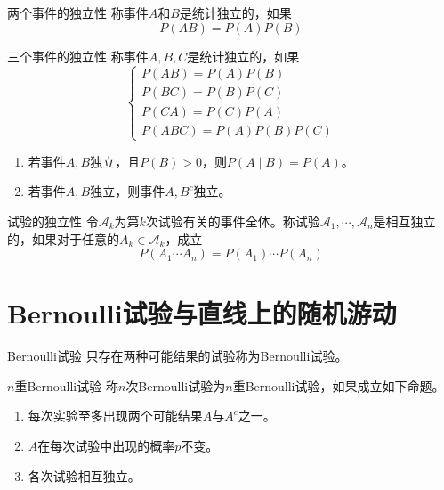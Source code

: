 \documentclass[lang = cn, scheme = chinese, thmcnt = section]{elegantbook}
\begin{document}
\begin{definition}{两个事件的独立性}
	称事件$A$和$B$是统计独立的，如果
	$$
	P(AB)=P(A)P(B)
	$$
\end{definition}

\begin{definition}{三个事件的独立性}
	称事件$A,B,C$是统计独立的，如果
	$$
	\begin{cases}
		P(AB)=P(A)P(B)\\
		P(BC)=P(B)P(C)\\
		P(CA)=P(C)P(A)\\
		P(ABC)=P(A)P(B)P(C)
	\end{cases}
	$$
\end{definition}

\begin{proposition}
	\begin{enumerate}
		\item 若事件$A,B$独立，且$P(B)>0$，则$P(A \mid B)=P(A)$。
		\item 若事件$A,B$独立，则事件$A,B^c$独立。
	\end{enumerate}
\end{proposition}

\begin{definition}{试验的独立性}
	令$\mathscr{A}_k$为第$k$次试验有关的事件全体。称试验$\mathscr{A}_1,\cdots,\mathscr{A}_n$是相互独立的，如果对于任意的$A_k\in \mathscr{A}_k$，成立
	$$
	P(A_1\cdots A_n)=P(A_1)\cdots P(A_n)
	$$
\end{definition}

\section{Bernoulli试验与直线上的随机游动}

\begin{definition}{Bernoulli试验}
	只存在两种可能结果的试验称为Bernoulli试验。
\end{definition}

\begin{definition}{$n$重Bernoulli试验}
	称$n$次Bernoulli试验为$n$重Bernoulli试验，如果成立如下命题。
	\begin{enumerate}
		\item 每次实验至多出现两个可能结果$A$与$A^c$之一。
		\item $A$在每次试验中出现的概率$p$不变。
		\item 各次试验相互独立。
	\end{enumerate}
\end{definition}
\end{document}
